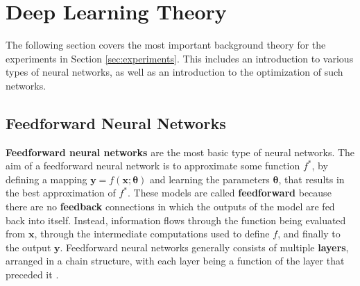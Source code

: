 \documentclass[./main.tex]{subfiles}
\begin{document}
\section{Deep Learning Theory}
The following section covers the most important background theory for the experiments in Section \ref{sec:experiments}. This includes an introduction to various types of neural networks, as well as an introduction to the optimization of such networks.

\subsection{Feedforward Neural Networks}
\textbf{Feedforward neural networks} are the most basic type of neural networks. The aim of a feedforward neural network is to approximate some function $f^*$, by defining a mapping $\bm{y} = f(\bm{x}; \bm{\theta})$ and learning the parameters $\bm{\theta}$, that results in the best approximation of $f^*$. These models are called \textbf{feedforward} because there are no \textbf{feedback} connections in which the outputs of the model are fed back into itself. Instead, information flows through the function being evaluated from $\bm{x}$, through the intermediate computations used to define $f$, and finally to the output $\bm{y}$. Feedforward neural networks generally consists of multiple \textbf{layers}, arranged in a chain structure, with each layer being a function of the layer that preceded it \cite{DL_book}. 
\end{document}
